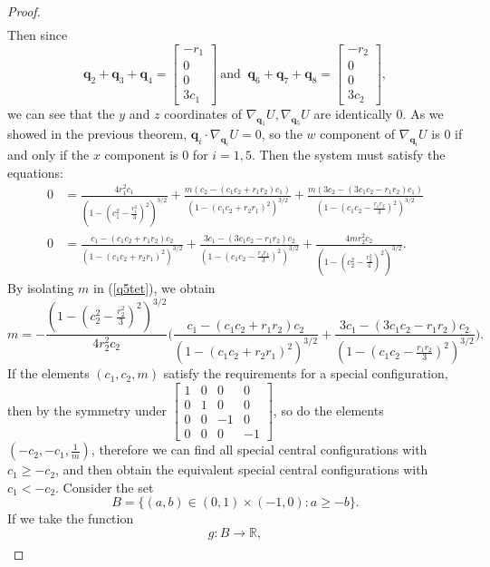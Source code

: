 \documentclass[12pt]{amsart}
\theoremstyle{definition}
\def \mb{\mathbb}
\def \R{\mb R}                 %
\newcommand {\q} {\mathbf{q}}
\begin{document}
{\begin{proof}
\begin{align*}
\end{align*}
Then since 
$$
\q_2+\q_3+\q_4=\begin{bmatrix}-r_1 \\ 0 \\ 0 \\ 3c_1\end{bmatrix}\ \text{and }\ \q_6+\q_7+\q_8=\begin{bmatrix}-r_2 \\ 0 \\ 0 \\ 3c_2\end{bmatrix},
$$ 
we can see that the $y$ and $z$ coordinates of $\nabla_{\q_1}U,\nabla_{\q_5}U$ are identically 0.
As we showed in the previous theorem, $\q_i \cdot \nabla_{\q_i}U=0$, so the $w$ component of $\nabla_{\q_i}U$ is 0 if and only if the $x$ component is 0 for $i=1,5$. Then the system must satisfy the equations:
\begin{align}
\label{q1tet}0&=\frac{4r_1^2c_1}{(1-(c_1^2-\frac{r_1^2}{3})^2)^{3/2}}+\frac{m(c_2-(c_1c_2+r_1r_2)c_1)}{(1-(c_1c_2+r_2r_1)^2)^{3/2}}+\frac{m(3c_2-(3c_1c_2-r_1r_2)c_1)}{(1-(c_1c_2-\frac{r_1r_2}{3})^2)^{3/2}}\\
\label{q5tet}0&=\frac{c_1-(c_1c_2+r_1r_2)c_2}{(1-(c_1c_2+r_2r_1)^2)^{3/2}}+\frac{3c_1-(3c_1c_2-r_1r_2)c_2}{(1-(c_1c_2-\frac{r_1r_2}{3})^2)^{3/2}}+\frac{4mr_2^2c_2}{(1-(c_2^2-\frac{r_2^2}{4})^2)^{3/2}}.\end{align}
By isolating $m$ in (\ref{q5tet}), we obtain\begin{equation}
\label{mtet}m=-\frac{(1-(c_2^2-\frac{r_2^2}{3})^2)^{3/2}}{4r_2^2c_2}\biggl(\frac{c_1-(c_1c_2+r_1r_2)c_2}{(1-(c_1c_2+r_2r_1)^2)^{3/2}}+\frac{3c_1-(3c_1c_2-r_1r_2)c_2}{(1-(c_1c_2-\frac{r_1r_2}{3})^2)^{3/2}}\biggr).
\end{equation}
If the elements $(c_1,c_2,m)$ satisfy the requirements for a special configuration, then by the symmetry under $\begin{bmatrix}1 & 0 & 0 & 0\\ 0 & 1 & 0 & 0\\ 0 & 0 & -1 & 0\\ 0 & 0 & 0 & -1\end{bmatrix}$, so do the elements $(-c_2,-c_1,\frac{1}{m})$, therefore we can find all special central configurations with $c_1 \geq -c_2$, and then obtain the equivalent special central configurations with $c_1<-c_2$. Consider the set 
$$
B=\{(a,b) \in (0,1) \times (-1,0): a\geq -b\}.
$$ 
If we take the function 
$$
g\colon B \to \R,
$$ 
\begin{align*}

\end{align*}
\end{proof}}
\end{document}
